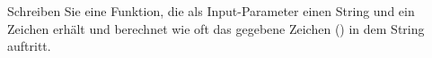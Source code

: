 \begin{aufg}[0]
Schreiben Sie eine Funktion, die als Input-Parameter einen String und ein Zeichen erh\"alt
und berechnet wie oft das gegebene Zeichen () in dem String auftritt.
\end{aufg}
